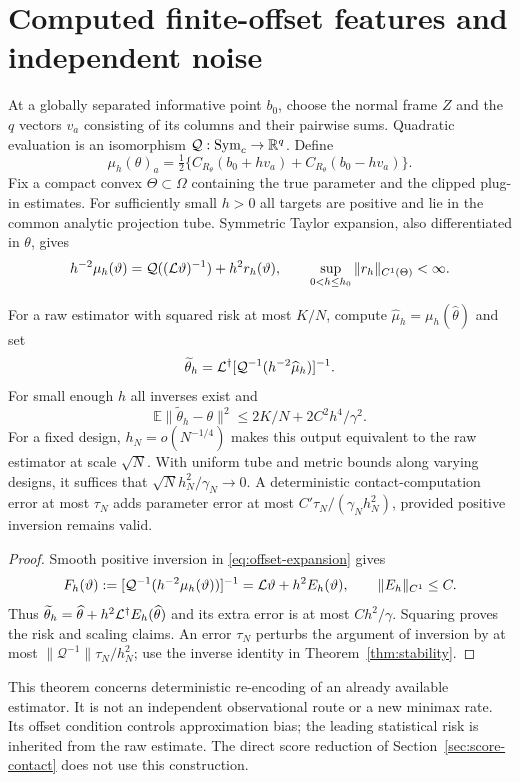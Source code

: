 \section{Computed finite-offset features and independent noise}\label{app:offset}
At a globally separated informative point $b_0$, choose the normal frame $Z$ and the $q$ vectors $v_a$ consisting of its columns and their pairwise sums. Quadratic evaluation is an isomorphism $\mathcal Q:\operatorname{Sym}_c\to\mathbb R^q$. Define
\[
 \mu_h(\theta)_a=\tfrac12\{C_{R_\theta}(b_0+hv_a)+C_{R_\theta}(b_0-hv_a)\}.
\]
Fix a compact convex $\Theta\subset\Omega$ containing the true parameter and the clipped plug-in estimates. For sufficiently small $h>0$ all targets are positive and lie in the common analytic projection tube. Symmetric Taylor expansion, also differentiated in $\theta$, gives
\begin{equation}\label{eq:offset-expansion}
 h^{-2}\mu_h(\vartheta)=\mathcal Q((\mathcal L\vartheta)^{-1})+h^2r_h(\vartheta),
 \qquad \sup_{0<h\le h_0}\|r_h\|_{C^1(\Theta)}<\infty.
\end{equation}
\begin{theorem}\label{thm:offset}
For a raw estimator with squared risk at most $K/N$, compute $\widehat\mu_h=\mu_h(\widehat\theta)$ and set
\[
 \widetilde\theta_h=\mathcal L^\dagger
       [\mathcal Q^{-1}(h^{-2}\widehat\mu_h)]^{-1}.
\]
For small enough $h$ all inverses exist and
\[
 \mathbb E\|\widetilde\theta_h-\theta\|^2\le2K/N+2C^2h^4/\gamma^2.
\]
For a fixed design, $h_N=o(N^{-1/4})$ makes this output equivalent to the raw estimator at scale $\sqrt N$. With uniform tube and metric bounds along varying designs, it suffices that $\sqrt Nh_N^2/\gamma_N\to0$. A deterministic contact-computation error at most $\tau_N$ adds parameter error at most $C'\tau_N/(\gamma_Nh_N^2)$, provided positive inversion remains valid.
\end{theorem}
\begin{proof}
Smooth positive inversion in \eqref{eq:offset-expansion} gives
\[
 F_h(\vartheta):=[\mathcal Q^{-1}(h^{-2}\mu_h(\vartheta))]^{-1}
             =\mathcal L\vartheta+h^2E_h(\vartheta),\qquad\|E_h\|_{C^1}\le C.
\]
Thus $\widetilde\theta_h=\widehat\theta+h^2\mathcal L^\dagger E_h(\widehat\theta)$ and its extra error is at most $Ch^2/\gamma$. Squaring proves the risk and scaling claims. An error $\tau_N$ perturbs the argument of inversion by at most $\|\mathcal Q^{-1}\|\tau_N/h_N^2$; use the inverse identity in Theorem~\ref{thm:stability}.
\end{proof}
This theorem concerns deterministic re-encoding of an already available estimator. It is not an independent observational route or a new minimax rate. Its offset condition controls approximation bias; the leading statistical risk is inherited from the raw estimate. The direct score reduction of Section~\ref{sec:score-contact} does not use this construction.

